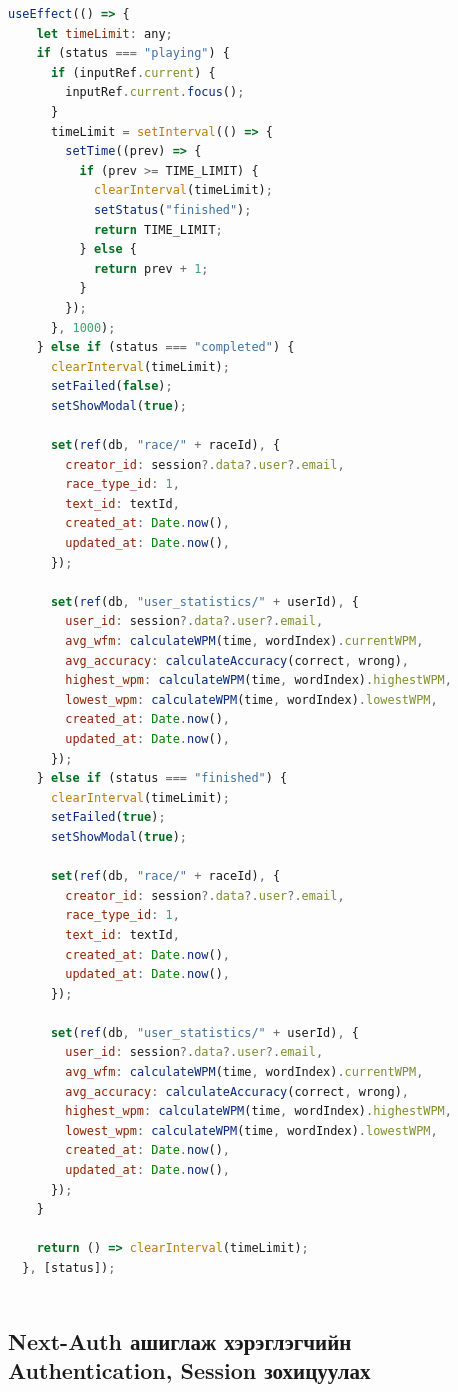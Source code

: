 \begin{lstlisting}[language=Javascript, caption=Тоглоомын цагийг удирдах Firebase өгөгдлийг шинэчлэхэд зориулсан useEffect hook, frame=single]
  useEffect(() => {
    let timeLimit: any;
    if (status === "playing") {
      if (inputRef.current) {
        inputRef.current.focus();
      }
      timeLimit = setInterval(() => {
        setTime((prev) => {
          if (prev >= TIME_LIMIT) {
            clearInterval(timeLimit);
            setStatus("finished");
            return TIME_LIMIT;
          } else {
            return prev + 1;
          }
        });
      }, 1000);
    } else if (status === "completed") {
      clearInterval(timeLimit);
      setFailed(false);
      setShowModal(true);

      set(ref(db, "race/" + raceId), {
        creator_id: session?.data?.user?.email,
        race_type_id: 1,
        text_id: textId,
        created_at: Date.now(),
        updated_at: Date.now(),
      });

      set(ref(db, "user_statistics/" + userId), {
        user_id: session?.data?.user?.email,
        avg_wfm: calculateWPM(time, wordIndex).currentWPM,
        avg_accuracy: calculateAccuracy(correct, wrong),
        highest_wpm: calculateWPM(time, wordIndex).highestWPM,
        lowest_wpm: calculateWPM(time, wordIndex).lowestWPM,
        created_at: Date.now(),
        updated_at: Date.now(),
      });
    } else if (status === "finished") {
      clearInterval(timeLimit);
      setFailed(true);
      setShowModal(true);

      set(ref(db, "race/" + raceId), {
        creator_id: session?.data?.user?.email,
        race_type_id: 1,
        text_id: textId,
        created_at: Date.now(),
        updated_at: Date.now(),
      });

      set(ref(db, "user_statistics/" + userId), {
        user_id: session?.data?.user?.email,
        avg_wfm: calculateWPM(time, wordIndex).currentWPM,
        avg_accuracy: calculateAccuracy(correct, wrong),
        highest_wpm: calculateWPM(time, wordIndex).highestWPM,
        lowest_wpm: calculateWPM(time, wordIndex).lowestWPM,
        created_at: Date.now(),
        updated_at: Date.now(),
      });
    }

    return () => clearInterval(timeLimit);
  }, [status]);
			
\end{lstlisting}


\subsection{Next-Auth ашиглаж хэрэглэгчийн Authentication, Session зохицуулах}

